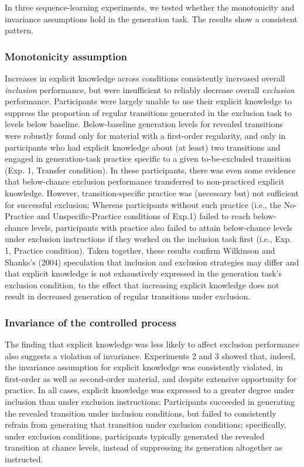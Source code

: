 \documentclass[jou]{apa6}
\theoremstyle{definition}
\theoremstyle{definition}
\theoremstyle{definition}
\theoremstyle{remark}
\begin{document}
In three sequence-learning experiments, we tested whether the
monotonicity and invariance assumptions hold in the generation task. The
results show a consistent pattern.

\subsubsection{Monotonicity assumption}\label{monotonicity-assumption}

Increases in explicit knowledge across conditions consistently increased
overall \emph{inclusion} performance, but were insufficient to reliably
decrease overall \emph{exclusion} performance. Participants were largely
unable to use their explicit knowledge to suppress the proportion of
regular transitions generated in the exclusion task to levels below
baseline. Below-baseline generation levels for revealed transitions were
robustly found only for material with a first-order regularity, and only
in participants who had explicit knowledge about (at least) two
transitions and engaged in generation-task practice specific to a given
to-be-excluded transition (Exp. 1, Transfer condition). In these
participants, there was even some evidence that below-chance exclusion
performance transferred to non-practiced explicit knowledge. However,
transition-specific practice was (necessary but) not sufficient for
successful exclusion: Whereas participants without such practice (i.e.,
the No-Practice and Unspecific-Practice conditions of Exp.1) failed to
reach below-chance levels, participants with practice also failed to
attain below-chance levels under exclusion instructions if they worked
on the inclusion task first (i.e., Exp. 1, Practice condition). Taken
together, these results confirm Wilkinson and Shanks's (2004)
speculation that inclusion and exclusion strategies may differ and that
explicit knowledge is not exhaustively expressed in the generation
task's exclusion condition, to the effect that increasing explicit
knowledge does not result in decreased generation of regular transitions
under exclusion.

\subsubsection{Invariance of the controlled
process}\label{invariance-of-the-controlled-process}

The finding that explicit knowledge was less likely to affect exclusion
performance also suggests a violation of invariance. Experiments 2 and 3
showed that, indeed, the invariance assumption for explicit knowledge
was consistently violated, in first-order as well as second-order
material, and despite extensive opportunity for practice. In all cases,
explicit knowledge was expressed to a greater degree under inclusion
than under exclusion instructions: Participants succeeded in generating
the revealed transition under inclusion conditions, but failed to
consistently refrain from generating that transition under exclusion
conditions; specifically, under exclusion conditions, participants
typically generated the revealed transition at chance levels, instead of
suppressing its generation altogether as instructed.
\end{document}
